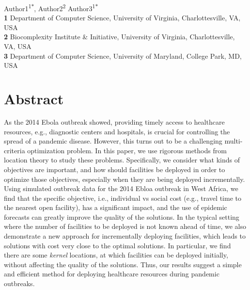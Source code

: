 \documentclass[10pt,letterpaper]{article}
\begin{document}
\vspace*{0.2in}

\begin{flushleft}
{\Large
\textbf{}
}\newline



Author1\textsuperscript{1$\ast$},
Author2\textsuperscript{2\dag}
Author3\textsuperscript{1$\ast$}
\\
\bigskip
\textbf{1} Department of Computer Science,  University of Virginia, Charlottesville, VA, USA \\
\textbf{2} Biocomplexity Institute \& Initiative, University of Virginia, Charlottesville, VA, USA \\
\textbf{3}  Department of Computer Science, University of Maryland, College Park, MD, USA
\bigskip



\end{flushleft}
\section*{Abstract}
As the 2014 Ebola outbreak showed, providing timely access to healthcare resources,
e.g., diagnostic centers and hospitals, is crucial for controlling the spread of a
pandemic disease. However, this turns out to be a challenging multi-criteria
optimization problem. In this paper, we use rigorous methods from location theory
to study these problems. Specifically, we consider what
kinds of objectives are important, and how should facilities be deployed in order to
optimize those objectives, especially when they are being deployed incrementally.
Using simulated outbreak data for the 2014 Ebloa outbreak in West Africa,
we find that the specific objective, i.e., individual vs social cost (e.g., travel time
to the nearest open facility), has a significant impact,
and the use of epidemic forecasts can greatly improve the quality of the solutions.
In the typical setting where the number of facilities to be deployed is not known ahead of time,
we also demonstrate a new approach for incrementally deploying facilities, which
leads to solutions with cost very close to the optimal solutions. In particular, we find
there are some \emph{kernel} locations, at which facilities can be deployed initially,
without affecting the quality of the solutions.
Thus, our results suggest a simple and efficient method for deploying healthcare resources
during pandemic outbreaks.
\end{document}
